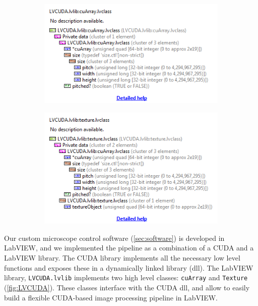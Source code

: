   \begin{figure}
    \centering
    \begin{subfigure}[t]{0.49\textwidth}
      \centering
      \includegraphics[width=\textwidth]{fusion/CuArray}
      \caption{}
    \end{subfigure}
    \begin{subfigure}[t]{0.49\textwidth}
      \centering
      \includegraphics[width=\textwidth]{fusion/Texture}
      \caption{}
    \end{subfigure}
    \label{fig:LVCUDA}
  \end{figure}

  Our custom microscope control software (\autoref{sec:software}) is developed in LabVIEW, and we implemented the pipeline as a combination of a CUDA and a LabVIEW library. The CUDA library implements all the necessary low level functions and exposes these in a dynamically linked library (dll). The LabVIEW library, \texttt{LVCUDA.lvlib} implements two high level classes: \texttt{cuArray} and \texttt{Texture} (\autoref{fig:LVCUDA}). These classes interface with the CUDA dll, and allow to easily build a flexible CUDA-based image processing pipeline in LabVIEW.


